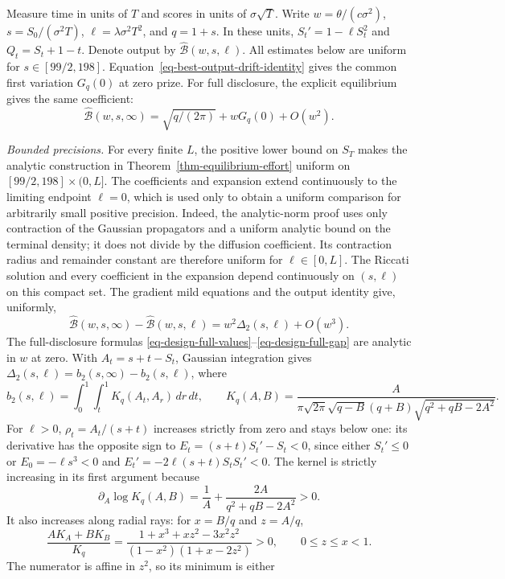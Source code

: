 \documentclass[mnsc]{informs3}
\begin{document}
\begin{APPENDICES}
{
Measure time in units of $T$ and scores in units of $\sigma\sqrt T$.
Write $w=\theta/(c\sigma^2)$, $s=S_0/(\sigma^2T)$,
$\ell=\lambda\sigma^2T^2$, and $q=1+s$. In these units,
$S_t'=1-\ell S_t^2$ and $Q_t=S_t+1-t$.
Denote output by $\widehat{\mathcal B}(w,s,\ell)$.
All estimates below are uniform for $s\in[99/2,198]$.
Equation~\eqref{eq-best-output-drift-identity} gives the common
first variation $G_q(0)$ at zero prize. For full disclosure, the
explicit equilibrium gives the same coefficient:
\begin{equation}\label{eq-design-full-first-variation}
\widehat{\mathcal B}(w,s,\infty)
=\sqrt{q/(2\pi)}+wG_q(0)+O(w^2).
\end{equation}

\emph{Bounded precisions.}
For every finite $L$, the positive lower bound on $S_T$ makes
the analytic construction in Theorem~\ref{thm-equilibrium-effort}
uniform on $[99/2,198]\times(0,L]$. The coefficients and expansion
extend continuously to the limiting endpoint $\ell=0$, which is used only
to obtain a uniform comparison for arbitrarily small positive precision.
Indeed, the analytic-norm proof uses only contraction of the Gaussian
propagators and a uniform analytic bound on the terminal density; it does
not divide by the diffusion coefficient. Its contraction radius and
remainder constant are therefore uniform for $\ell\in[0,L]$. The Riccati
solution and every coefficient in the expansion depend continuously on
$(s,\ell)$ on this compact set.
The gradient mild equations and the output identity give, uniformly,
\[
\widehat{\mathcal B}(w,s,\infty)-\widehat{\mathcal B}(w,s,\ell)
=w^2\Delta_2(s,\ell)+O(w^3).
\]
The full-disclosure formulas \eqref{eq-design-full-values}--\eqref{eq-design-full-gap}
are analytic in $w$ at zero.
With $A_t=s+t-S_t$, Gaussian integration gives
$\Delta_2(s,\ell)=b_2(s,\infty)-b_2(s,\ell)$, where
\[
b_2(s,\ell)=\int_0^1\int_t^1 K_q(A_t,A_r)\,dr\,dt,\qquad
K_q(A,B)=\frac{A}{\pi\sqrt{2\pi}\sqrt{q-B}(q+B)
\sqrt{q^2+qB-2A^2}}.
\]
For $\ell>0$, $\rho_t=A_t/(s+t)$ increases strictly from zero
and stays below one: its derivative has the opposite sign to
$E_t=(s+t)S_t'-S_t<0$, since either $S_t'\leq0$ or
$E_0=-\ell s^3<0$ and $E_t'=-2\ell(s+t)S_tS_t'<0$.
The kernel is strictly increasing in its first argument because
\[
\partial_A\log K_q(A,B)
=\frac1A+\frac{2A}{q^2+qB-2A^2}>0.
\]
It also increases along radial rays: for
$x=B/q$ and $z=A/q$,
\[
\frac{AK_A+BK_B}{K_q}
=\frac{1+x^3+xz^2-3x^2z^2}
{(1-x^2)(1+x-2z^2)}>0,\qquad 0\leq z\leq x<1.
\]
The numerator is affine in $z^2$, so its minimum is either
}
\end{APPENDICES}
\end{document}
